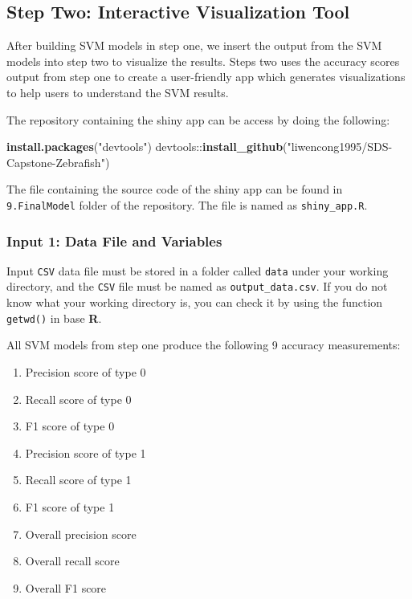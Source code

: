 \documentclass[10pt,letterpaper]{article}
\newenvironment{Shaded}{\begin{snugshade}}{\end{snugshade}}
\newcommand{\KeywordTok}[1]{\textcolor[rgb]{0.13,0.29,0.53}{\textbf{{#1}}}}
\newcommand{\StringTok}[1]{\textcolor[rgb]{0.31,0.60,0.02}{{#1}}}
\newcommand{\NormalTok}[1]{{#1}}
\providecommand{\tightlist}{%
  \setlength{\itemsep}{0pt}\setlength{\parskip}{0pt}}
\begin{document}
\subsection{Step Two: Interactive Visualization
Tool}\label{step-two-interactive-visualization-tool}

After building SVM models in step one, we insert the output from the SVM
models into step two to visualize the results. Steps two uses the
accuracy scores output from step one to create a user-friendly app which
generates visualizations to help users to understand the SVM results.

The repository containing the shiny app can be access by doing the
following:

\begin{Shaded}
\begin{Highlighting}[]
\KeywordTok{install.packages}\NormalTok{(}\StringTok{"devtools"}\NormalTok{)}
\NormalTok{devtools::}\KeywordTok{install_github}\NormalTok{(}\StringTok{"liwencong1995/SDS-Capstone-Zebrafish"}\NormalTok{)}
\end{Highlighting}
\end{Shaded}

The file containing the source code of the shiny app can be found in
\texttt{9.FinalModel} folder of the repository. The file is named as
\texttt{shiny\_app.R}.

\subsubsection{Input 1: Data File and
Variables}\label{input-1-data-file-and-variables}

Input \texttt{CSV} data file must be stored in a folder called
\texttt{data} under your working directory, and the \texttt{CSV} file
must be named as \texttt{output\_data.csv}. If you do not know what your
working directory is, you can check it by using the function
\texttt{getwd()} in base \textbf{R}.

All SVM models from step one produce the following 9 accuracy
measurements:

\begin{enumerate}
\def\labelenumi{\arabic{enumi}.}
\tightlist
\item
  Precision score of type 0
\item
  Recall score of type 0
\item
  F1 score of type 0
\item
  Precision score of type 1
\item
  Recall score of type 1
\item
  F1 score of type 1
\item
  Overall precision score
\item
  Overall recall score
\item
  Overall F1 score
\end{enumerate}
\end{document}

